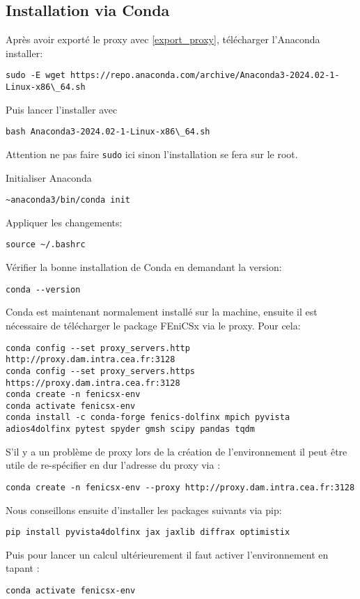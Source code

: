 \documentclass[10pt]{book}
\begin{document}
\subsection{Installation via Conda}\label{Subsection:Conda}
Après avoir exporté le proxy avec \eqref{export_proxy}, télécharger l'Anaconda installer:
\begin{verbatim}
sudo -E wget https://repo.anaconda.com/archive/Anaconda3-2024.02-1-Linux-x86\_64.sh
\end{verbatim}
Puis lancer l'installer avec
\begin{verbatim}
bash Anaconda3-2024.02-1-Linux-x86\_64.sh
\end{verbatim}
\begin{Rem}{Attention ne pas faire \texttt{sudo} ici sinon l'installation se fera sur le root.}\end{Rem}
Initialiser Anaconda
\begin{verbatim}
~anaconda3/bin/conda init
\end{verbatim}
Appliquer les changements:
\begin{verbatim}
source ~/.bashrc
\end{verbatim}
Vérifier la bonne installation de Conda en demandant la version:
\begin{verbatim}
conda --version
\end{verbatim}
Conda est maintenant normalement installé sur la machine, ensuite il est nécessaire de télécharger le package FEniCSx via le proxy. Pour cela:
\begin{verbatim}
conda config --set proxy_servers.http http://proxy.dam.intra.cea.fr:3128
conda config --set proxy_servers.https https://proxy.dam.intra.cea.fr:3128
conda create -n fenicsx-env
conda activate fenicsx-env
conda install -c conda-forge fenics-dolfinx mpich pyvista adios4dolfinx pytest spyder gmsh scipy pandas tqdm
\end{verbatim}
S'il y a un problème de proxy lors de la création de l'environnement il peut être utile de re-spécifier en dur l'adresse du proxy via :
\begin{verbatim}
conda create -n fenicsx-env --proxy http://proxy.dam.intra.cea.fr:3128
\end{verbatim}
Nous conseillons ensuite d'installer les packages suivants via pip:
\begin{verbatim}
pip install pyvista4dolfinx jax jaxlib diffrax optimistix
\end{verbatim}
Puis pour lancer un calcul ultérieurement il faut activer l'environnement en tapant :
\begin{verbatim}
conda activate fenicsx-env
\end{verbatim}
\end{document}
